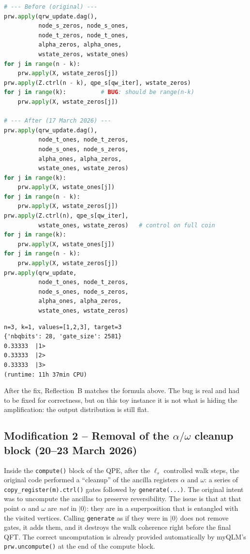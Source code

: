 \documentclass[11pt,a4paper]{article}
\begin{document}
\begin{lstlisting}[language=Python]
# --- Before (original) ---
prw.apply(qrw_update.dag(),
          node_s_zeros, node_s_ones,
          node_t_zeros, node_t_ones,
          alpha_zeros, alpha_ones,
          wstate_zeros, wstate_ones)
for j in range(n - k):
    prw.apply(X, wstate_zeros[j])
prw.apply(Z.ctrl(n - k), qpe_s[qw_iter], wstate_zeros)
for j in range(k):          # BUG: should be range(n-k)
    prw.apply(X, wstate_zeros[j])

# --- After (17 March 2026) ---
prw.apply(qrw_update.dag(),
          node_t_ones, node_t_zeros,
          node_s_ones, node_s_zeros,
          alpha_ones, alpha_zeros,
          wstate_ones, wstate_zeros)
for j in range(k):
    prw.apply(X, wstate_ones[j])
for j in range(n - k):
    prw.apply(X, wstate_zeros[j])
prw.apply(Z.ctrl(n), qpe_s[qw_iter],
          wstate_ones, wstate_zeros)   # control on full coin
for j in range(k):
    prw.apply(X, wstate_ones[j])
for j in range(n - k):
    prw.apply(X, wstate_zeros[j])
prw.apply(qrw_update,
          node_t_ones, node_t_zeros,
          node_s_ones, node_s_zeros,
          alpha_ones, alpha_zeros,
          wstate_ones, wstate_zeros)
\end{lstlisting}

\begin{lstlisting}[style=plain]
n=3, k=1, values=[1,2,3], target=3
{'nbqbits': 28, 'gate_size': 2581}
0.33333  |1>
0.33333  |2>
0.33333  |3>
(runtime: 11h 37min CPU)
\end{lstlisting}

After the fix, Reflection~B matches the formula above. The bug is
real and had to be fixed for correctness, but on this toy instance
it is not what is hiding the amplification: the output distribution
is still flat.

\subsection*{Modification 2 -- Removal of the
$\alpha/\omega$ cleanup block (20--23 March 2026)}

Inside the \texttt{compute()} block of the QPE, after the $\ell_s$
controlled walk steps, the original code performed a ``cleanup'' of
the ancilla registers $\alpha$ and $\omega$: a series of
\texttt{copy\_register(m).ctrl()} gates followed by
\texttt{generate(...)}. The original intent was to uncompute the
ancillas to preserve reversibility. The issue is that at that point
$\alpha$ and $\omega$ are \emph{not} in $|0\rangle$: they are in a
superposition that is entangled with the visited vertices. Calling
\texttt{generate} as if they were in $|0\rangle$ does not remove
gates, it adds them, and it destroys the walk coherence right before
the final QFT. The correct uncomputation is already provided
automatically by myQLM's \texttt{prw.uncompute()} at the end of the
compute block.
\end{document}
